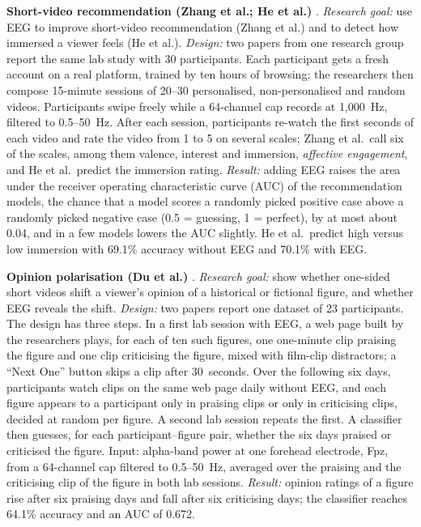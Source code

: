 \documentclass[12pt,a4paper]{report}
\begin{document}
\textbf{Short-video recommendation (Zhang et al.; He et al.)} \cite{zhang_eeg-svrec_2024, he_understanding_2023}. \emph{Research goal:} use EEG to improve short-video recommendation (Zhang et al.) and to detect how immersed a viewer feels (He et al.). \emph{Design:} two papers from one research group report the same lab study with 30 participants. Each participant gets a fresh account on a real platform, trained by ten hours of browsing; the researchers then compose 15-minute sessions of 20--30 personalised, non-personalised and random videos. Participants swipe freely while a 64-channel cap records at 1,000~Hz, filtered to 0.5--50~Hz. After each session, participants re-watch the first seconds of each video and rate the video from 1 to 5 on several scales; Zhang et al.\ call six of the scales, among them valence, interest and immersion, \emph{affective engagement}, and He et al.\ predict the immersion rating. \emph{Result:} adding EEG raises the area under the receiver operating characteristic curve (AUC) of the recommendation models, the chance that a model scores a randomly picked positive case above a randomly picked negative case (0.5 = guessing, 1 = perfect), by at most about 0.04, and in a few models lowers the AUC slightly. He et al.\ predict high versus low immersion with 69.1\% accuracy without EEG and 70.1\% with EEG.

\textbf{Opinion polarisation (Du et al.)} \cite{du_understanding_2025, du_eeg_2025}. \emph{Research goal:} show whether one-sided short videos shift a viewer's opinion of a historical or fictional figure, and whether EEG reveals the shift. \emph{Design:} two papers report one dataset of 23 participants. The design has three steps. In a first lab session with EEG, a web page built by the researchers plays, for each of ten such figures, one one-minute clip praising the figure and one clip criticising the figure, mixed with film-clip distractors; a ``Next One'' button skips a clip after 30~seconds. Over the following six days, participants watch clips on the same web page daily without EEG, and each figure appears to a participant only in praising clips or only in criticising clips, decided at random per figure. A second lab session repeats the first. A classifier then guesses, for each participant--figure pair, whether the six days praised or criticised the figure. Input: alpha-band power at one forehead electrode, Fpz, from a 64-channel cap filtered to 0.5--50~Hz, averaged over the praising and the criticising clip of the figure in both lab sessions. \emph{Result:} opinion ratings of a figure rise after six praising days and fall after six criticising days; the classifier reaches 64.1\% accuracy and an AUC of 0.672.
\end{document}
